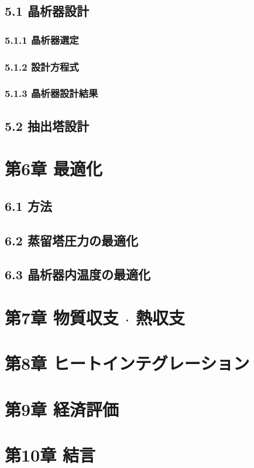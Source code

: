 \documentclass[a4j]{jsreport}
\begin{document}
\section*{5.1 晶析器設計}
\subsection*{5.1.1 晶析器選定}
\subsection*{5.1.2 設計方程式}
\subsection*{5.1.3 晶析器設計結果}

\section*{5.2 抽出塔設計}

\chapter*{第6章 最適化}
\section*{6.1 方法}
\section*{6.2 蒸留塔圧力の最適化}
\section*{6.3 晶析器内温度の最適化}

\chapter*{第7章 物質収支 $\cdot$ 熱収支}

\chapter*{第8章 ヒートインテグレーション}

\chapter*{第9章 経済評価}

\chapter*{第10章 結言}
\end{document}
